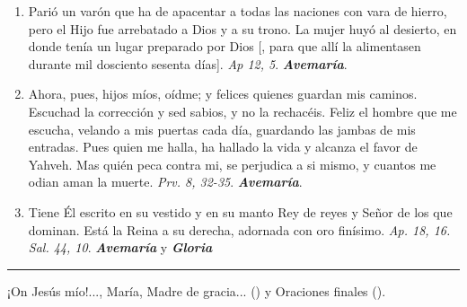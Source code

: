 \documentclass[./rosary.tex]{subfiles}
\begin{document}
\begin{enumerate}
    \item Parió un varón que ha de apacentar a todas las naciones con vara de hierro, pero el Hijo fue arrebatado a Dios y a su trono. La mujer huyó
          al desierto, en donde tenía un lugar preparado por Dios [, para que allí la alimentasen durante mil dosciento sesenta días]. \emph{Ap 12, 5}. \textbf{\emph{Avemaría}}.

    \item Ahora, pues, hijos míos, oídme; y felices quienes guardan mis caminos. Escuchad la corrección y sed sabios, y no la rechacéis.
          Feliz el hombre que me escucha, velando a mis puertas cada día, guardando las jambas de mis entradas. Pues quien me halla, ha hallado la vida y alcanza el favor
          de Yahveh. Mas quién peca contra mi, se perjudica a si mismo, y cuantos me odian aman la muerte. \emph{Prv. 8, 32-35}. \textbf{\emph{Avemaría}}.

    \item Tiene Él escrito en su vestido y en su manto Rey de reyes y Señor de los que dominan. Está la Reina a su derecha, adornada con oro finísimo.
          \emph{Ap. 18, 16. Sal. 44, 10}. \textbf{\emph{Avemaría}} y \textbf{\emph{Gloria}}
\end{enumerate}

\rule{\textwidth}{0.5pt}
¡On Jesús mío!..., María, Madre de gracia... () y Oraciones finales ().
\end{document}
